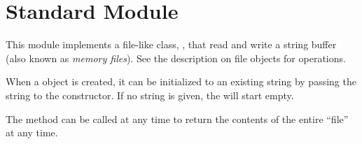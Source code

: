 \section{Standard Module }


This module implements a file-like class, ,
that read and write a string buffer (also known as {\em memory
files}). See the description on file objects for operations.

When a  object is created, it can be initialized
to an existing string by passing the string to the constructor.
If no string is given, the  will start empty.

The method  can be called at any time to return the
contents of the entire ``file'' at any time.
